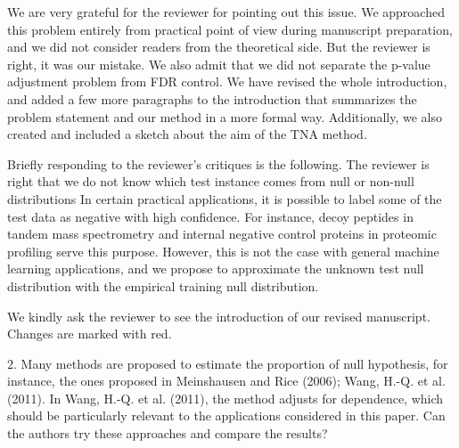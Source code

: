 \documentclass{article}
\newcommand{\response}[1]{\vspace*{1ex} \color{blue} \noindent #1 \color{black}
\vspace*{2ex}}
\begin{document}
\response{We are very grateful for the reviewer for pointing out this issue. We approached this problem entirely from practical point of view during manuscript preparation, and we did not consider readers from the theoretical side. But the reviewer is right, it was our mistake. We also admit that we did not separate the p-value adjustment problem from FDR control. We have revised the whole introduction, and added a few more paragraphs to the introduction that summarizes the problem statement and our method in a more formal way. Additionally, we also created and included a sketch about the aim of the TNA method.
	
Briefly responding to the reviewer's critiques is the following. The reviewer is right that we do not know which test instance comes from null or non-null distributions  In certain practical applications, it is possible to label some of the test data as negative with high confidence. For instance, decoy peptides\cite{elias2007target} in tandem mass spectrometry and internal negative control proteins \cite{gao2023simultaneous} in proteomic profiling serve this purpose. However, this is not the case with general machine learning applications, and we propose to approximate the unknown test null distribution with the empirical training null distribution. 

We kindly ask the reviewer to see the introduction of  our revised manuscript. Changes are marked with red.}



2. Many methods are proposed to estimate the proportion of null hypothesis, for instance, the ones proposed in Meinshausen and Rice (2006); Wang, H.-Q. et al. (2011). In Wang, H.-Q. et al. (2011), the method adjusts for dependence, which should be particularly relevant to the applications considered in this paper. Can the authors try these approaches and compare the results?
\end{document}
